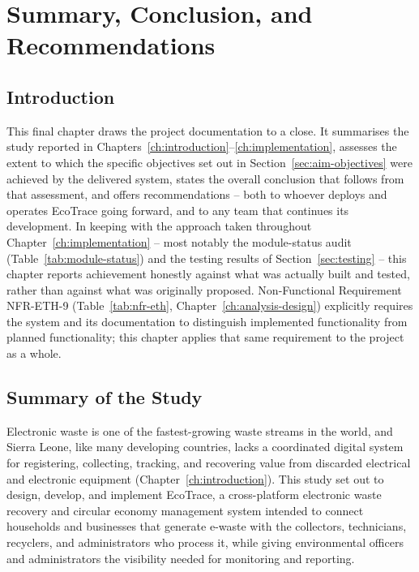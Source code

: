 \chapter{Summary, Conclusion, and Recommendations}
\label{ch:conclusion}

\section{Introduction}

This final chapter draws the project documentation to a close. It summarises
the study reported in Chapters~\ref{ch:introduction}--\ref{ch:implementation},
assesses the extent to which the specific objectives set out in
Section~\ref{sec:aim-objectives} were achieved by the delivered system,
states the overall conclusion that follows from that assessment, and offers
recommendations -- both to whoever deploys and operates EcoTrace going
forward, and to any team that continues its development. In keeping with the
approach taken throughout Chapter~\ref{ch:implementation} -- most notably
the module-status audit (Table~\ref{tab:module-status}) and the testing
results of Section~\ref{sec:testing} -- this chapter reports achievement
honestly against what was actually built and tested, rather than against
what was originally proposed. Non-Functional Requirement NFR-ETH-9
(Table~\ref{tab:nfr-eth}, Chapter~\ref{ch:analysis-design}) explicitly
requires the system and its documentation to distinguish implemented
functionality from planned functionality; this chapter applies that same
requirement to the project as a whole.

\section{Summary of the Study}

Electronic waste is one of the fastest-growing waste streams in the world,
and Sierra Leone, like many developing countries, lacks a coordinated
digital system for registering, collecting, tracking, and recovering value
from discarded electrical and electronic equipment (Chapter~\ref{ch:introduction}).
This study set out to design, develop, and implement EcoTrace, a
cross-platform electronic waste recovery and circular economy management
system intended to connect households and businesses that generate e-waste
with the collectors, technicians, recyclers, and administrators who process
it, while giving environmental officers and administrators the visibility
needed for monitoring and reporting.

